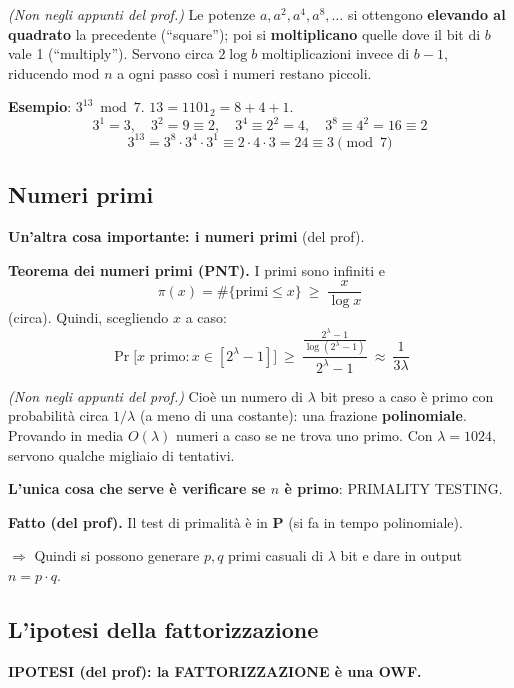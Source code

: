 \begin{nota}
\emph{(Non negli appunti del prof.)} Le potenze \(a, a^2, a^4, a^8, \dots\) si ottengono \textbf{elevando al quadrato} la precedente (``square''); poi si \textbf{moltiplicano} quelle dove il bit di \(b\) vale 1 (``multiply''). Servono circa \(2 \log b\) moltiplicazioni invece di \(b - 1\), riducendo mod \(n\) a ogni passo così i numeri restano piccoli.

\textbf{Esempio}: \(3^{13} \bmod 7\). \(13 = 1101_2 = 8 + 4 + 1\).
\[
3^1 = 3, \quad 3^2 = 9 \equiv 2, \quad 3^4 \equiv 2^2 = 4, \quad 3^8 \equiv 4^2 = 16 \equiv 2
\]
\[
3^{13} = 3^8 \cdot 3^4 \cdot 3^1 \equiv 2 \cdot 4 \cdot 3 = 24 \equiv 3 \pmod 7
\]
\end{nota}

\subsection{Numeri primi}

\textbf{Un'altra cosa importante: i numeri primi} (del prof).

\textbf{Teorema dei numeri primi (PNT).} I primi sono infiniti e
\[
\pi(x) = \#\{\text{primi} \le x\} \ \ge\ \frac{x}{\log x}
\]
(circa). Quindi, scegliendo \(x\) a caso:
\[
\Pr\big[x \text{ primo} : x \in [2^\lambda - 1]\big] \ \ge\ \frac{\frac{2^\lambda - 1}{\log(2^\lambda - 1)}}{2^\lambda - 1} \ \approx\ \frac{1}{3\lambda}
\]

\emph{(Non negli appunti del prof.)} Cioè un numero di \(\lambda\) bit preso a caso è primo con probabilità circa \(1/\lambda\) (a meno di una costante): una frazione \textbf{polinomiale}. Provando in media \(O(\lambda)\) numeri a caso se ne trova uno primo. Con \(\lambda = 1024\), servono qualche migliaio di tentativi.

\textbf{L'unica cosa che serve è verificare se \(n\) è primo}: PRIMALITY TESTING.

\textbf{Fatto (del prof).} Il test di primalità è in \textbf{P} (si fa in tempo polinomiale).

\(\Rightarrow\) Quindi si possono generare \(p, q\) primi casuali di \(\lambda\) bit e dare in output \(n = p \cdot q\).

\subsection{L'ipotesi della fattorizzazione}

\textbf{IPOTESI (del prof): la FATTORIZZAZIONE è una OWF.}

